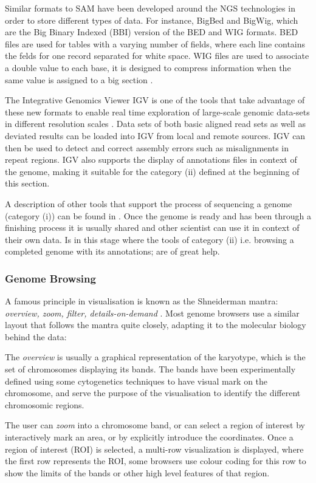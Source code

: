 Similar formats to SAM have been developed around the NGS technologies in order to store different types of data.  For instance, BigBed and BigWig, which  are the Big Binary Indexed (BBI) version of the BED and WIG formats. BED files are used for tables with a varying number of fields, where each line contains the felds for one record separated for white space. WIG files are used to associate a double value to each base, it is designed to compress information when the same value is assigned to a big section \cite{KEN2010}.

The Integrative Genomics Viewer IGV is one of the tools that take advantage of these new formats to enable real time exploration of large-scale genomic data-sets in different resolution scales \cite{ROB2011}. Data sets of both basic aligned read sets as well as deviated results can be loaded into IGV from local and remote sources. IGV can then be used to detect and correct assembly errors such as misalignments in repeat regions. IGV also supports the display of annotations files in context of the genome, making it suitable for the category (ii) defined at the beginning of this section.

A description of other tools that support the process of sequencing a genome (category (i)) can be found in \cite{NIE2010}. Once the genome is ready and has been through a finishing process it is usually shared and other scientist can use it in context of their own data. Is in this stage where the tools of category (ii) i.e. browsing a completed genome with its annotations; are of great help.

\subsubsection{Genome Browsing}
A famous principle in visualisation is known as the Shneiderman mantra: \emph{overview, zoom, filter, details-on-demand} \cite{SHN1996}. Most genome browsers use a similar layout that follows the mantra quite closely, adapting it to the molecular biology behind the data:

The \emph{overview} is usually a graphical representation of the karyotype, which is the set of chromosomes displaying its bands. The bands have been experimentally defined using some cytogenetics techniques to have visual mark on the chromosome, and serve the purpose of the visualisation to identify the different chromosomic regions.

The user can \emph{zoom} into a chromosome band, or can select a region of interest by interactively mark an area, or by explicitly introduce the coordinates. Once a region of interest (ROI) is selected, a multi-row visualization is displayed, where the first row represents the ROI, some browsers use colour coding for this row to show the limits of the bands or other high level features of that region.


